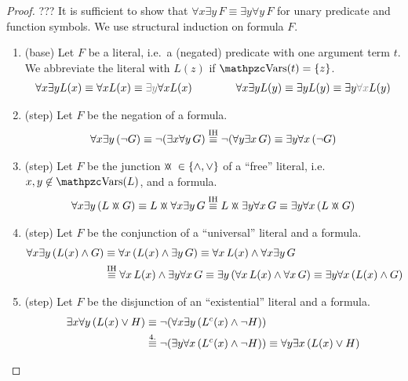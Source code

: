 \begin{proof} ??? It is sufficient to show  
	that $\forall x\exists y\,F\equiv\exists y\forall y\,F$
	for unary predicate and function symbols.
	We use structural induction on formula $F$.
	\begin{enumerate}
		\item (base) Let $F$ be a literal,
		i.e.~a (negated) predicate with one argument term $t$.
		We abbreviate the literal with $L(z)$ if $\var(t) = \{ z \}$. 
		\begin{gather*}
			\forall x \exists y L(x)  \equiv \forall x L(x) \equiv {\colG \exists y} \forall x L(x)
			\qquad\qquad
			\forall x \exists y L(y)  \equiv \exists y L(y) \equiv \exists y{\colG \forall x}  L(y)
		\end{gather*}
		\item (step) Let $F$ be the negation of a formula.
		\begin{gather*}
		\forall x \exists y\, (\lnot G) 
		\equiv \lnot (\exists x \forall y\, G)
		\defEV[IH] \lnot (\forall y\exists x \, G) 
		\equiv \exists y \forall x\, (\lnot G)
		\end{gather*}
		\item (step) Let $F$ be the junction $\landlor{}\in\{\land,\lor\}$ of a “free” literal, i.e.~$x,y\not\in\var(L)$, and a formula.
		\begin{gather*}
		\forall x\exists y\,( L \landlor G) 
		\equiv L \landlor \forall x\exists y\, G
		\defEV[IH]L \landlor \exists y\forall x\, G
		\equiv\exists y\forall x\,( L \landlor G )
		\end{gather*}
		\item (step) Let $F$ be the conjunction of a “universal” literal and a formula.
		\begin{align*}
		\forall x \exists y\,({L(x)\land G}) 
		&\equiv \forall x\,({L(x)} \land \exists y\,G)
		\equiv \forall x\,L(x)\land \forall x\exists y\,G
		\\&\defEV[IH] \forall x\,{L(x)} \land \exists y\forall x\,G
		\equiv\exists y\,(\forall x\,L(x)\land \forall x\,G)
		\equiv\exists y \forall x\,({L(x)\land G})
		\end{align*}
		\item (step) Let $F$ be the disjunction of an “existential” literal and a formula.
		\begin{align*}
		\exists x \forall y\,(L(x)\lor H) 
		&\equiv \lnot(\forall x\exists y\,(L^c(x)\land \lnot H)) \\
		&\defEV[4.]\lnot( \exists y\forall x\,(L^c(x)\land \lnot H) )
		\equiv \forall y \exists x\,(L(x)\lor H)
		\end{align*}
		

\end{enumerate}
\end{proof}

